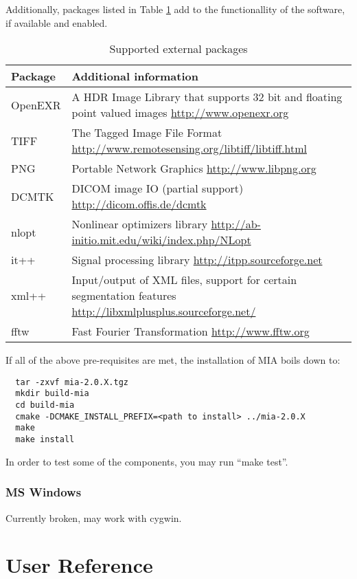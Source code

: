 \documentclass[english, 10pt, a4paper,headsepline,openany]{scrbook}
\begin{document}
\noindent 
Additionally, packages listed in Table \ref{tab:external} add to the functionallity of the software, 
   if available and enabled.

\begin{table}[h]
\caption{\label{tab:external}Supported external packages}
\begin{tabularx}{\linewidth}{lX}
\hline 
{\bf Package } & {\bf Additional information} \\
\hline 
\hline 
{ OpenEXR } & A HDR Image Library that supports 32 bit and floating point valued 
                 images \url{http://www.openexr.org} \\
\hline 
{ TIFF } & The Tagged Image File Format \url{http://www.remotesensing.org/libtiff/libtiff.html} \\
\hline 
{ PNG } & Portable Network Graphics \url{http://www.libpng.org} \\
\hline 
{ DCMTK } & DICOM image IO (partial support) \url{http://dicom.offis.de/dcmtk} \\
\hline 
{ nlopt } & Nonlinear optimizers library  \url{http://ab-initio.mit.edu/wiki/index.php/NLopt} \\
\hline 
{ it++ } & Signal processing library \url{http://itpp.sourceforge.net}  \\
\hline 
{ xml++ } & Input/output of XML files, support for certain segmentation features \url{http://libxmlplusplus.sourceforge.net/} \\
\hline 
{ fftw } & Fast Fourier Transformation \url{http://www.fftw.org}  \\
\hline 
\end{tabularx}
\end{table}

If all of the above pre-requisites are met, the installation of MIA boils down to:

\lstset{language=bash}
\begin{lstlisting}
  tar -zxvf mia-2.0.X.tgz
  mkdir build-mia
  cd build-mia
  cmake -DCMAKE_INSTALL_PREFIX=<path to install> ../mia-2.0.X
  make
  make install
\end{lstlisting}
In order to test some of the components, you may run ``make test''. 

\subsection{MS Windows} 

Currently broken, may work with cygwin. 

\chapter{User Reference}
\end{document}
